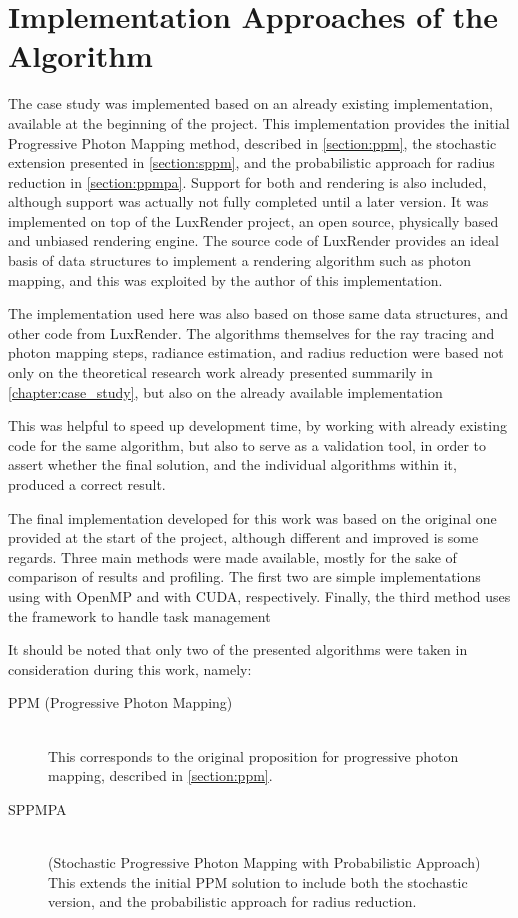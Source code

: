 \documentclass[main.tex]{subfiles}
\begin{document}
\chapter{Implementation Approaches of the Algorithm} \label{chapter:impl}

The case study was implemented based on an already existing implementation, available at the beginning of the project. This implementation provides the initial Progressive Photon Mapping method, described in \cref{section:ppm}, the stochastic extension presented in \cref{section:sppm}, and the probabilistic approach for radius reduction in \cref{section:ppmpa}. Support for both \cpu and \cuda rendering is also included, although \cuda support was actually not fully completed until a later version. It was implemented on top of the LuxRender project, an open source, physically based and unbiased rendering engine. The source code of LuxRender provides an ideal basis of data structures to implement a rendering algorithm such as photon mapping, and this was exploited by the author of this implementation.

The implementation used here was also based on those same data structures, and other code from LuxRender. The algorithms themselves for the ray tracing and photon mapping steps, radiance estimation, and radius reduction were based not only on the theoretical research work already presented summarily in \cref{chapter:case_study}, but also on the already available implementation

This was helpful to speed up development time, by working with already existing code for the same algorithm, but also to serve as a validation tool, in order to assert whether the final solution, and the individual algorithms within it, produced a correct result.

The final implementation developed for this work was based on the original one provided at the start of the project, although different and improved is some regards. Three main methods were made available, mostly for the sake of comparison of results and profiling. The first two are simple implementations using \cpus with \acs{OpenMP} and \gpus with \acs{CUDA}, respectively. Finally, the third method uses the \starpu framework to handle task management

It should be noted that only two of the presented algorithms were taken in consideration during this work, namely:

\begin{description}
\item[PPM (Progressive Photon Mapping)] \hfill \\
  This corresponds to the original proposition for progressive photon mapping, described in \cref{section:ppm}.

\item[SPPMPA] \hfill \\
  (Stochastic Progressive Photon Mapping with Probabilistic Approach) This extends the initial PPM solution to include both the stochastic version, and the probabilistic approach for radius reduction.
\end{description}
\end{document}
